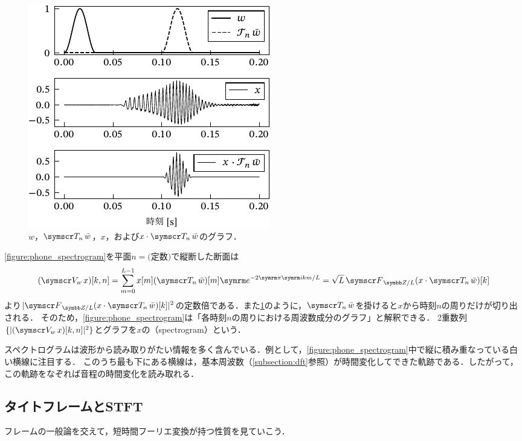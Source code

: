 \documentclass[../../main]{subfiles}
\begin{document}
\begin{figure}[htbp]
  \centering
  \includegraphics{figures/windowing.pdf}
  \caption{\(w\)，\(\translate{n}\conj{w}\)，\(x\)，および\(x\cdot\translate{n}\conj{w}\)のグラフ．}
  \label{figure:windowing}
\end{figure}

\cref{figure:phone_spectrogram}を平面\(n=\text{(定数)}\)で縦断した断面は
\[
  (\stft{w}x)[k,n] = \sum_{m=0}^{L-1}x[m](\translate{n}\conj{w})[m]\napr^{-2\krez\iuni km/L}
  = \sqrt{L}\dft{L}(x\cdot\translate{n}\conj{w})[k]
\]
より\(\abs{\dft{L}(x\cdot\translate{n}\conj{w})[k]}^2\)の定数倍である．また\cref{figure:windowing}のように，\(\translate{n}\conj{w}\)を掛けると\(x\)から時刻\(n\)の周りだけが切り出される．
そのため，\cref{figure:phone_spectrogram}は「各時刻\(n\)の周りにおける周波数成分のグラフ」と解釈できる．
2重数列\(\seq{\abs{(\stft{w}x)[k,n]}^2}\)とグラフを\(x\)の（spectrogram）という．

スペクトログラムは波形から読み取りがたい情報を多く含んでいる．例として，\cref{figure:phone_spectrogram}中で縦に積み重なっている白い横線に注目する．
このうち最も下にある横線は，基本周波数（\cref{subsection:dft}参照）が時間変化してできた軌跡である．したがって，この軌跡をなぞれば音程の時間変化を読み取れる．

\subsection{タイトフレームとSTFT}

フレームの一般論を交えて，短時間フーリエ変換が持つ性質を見ていこう．
\end{document}
